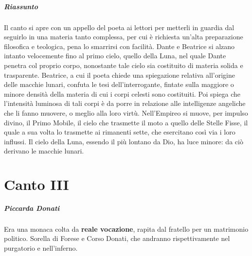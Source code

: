 \documentclass[a4paper, twoside, titlepage]{book}
\newcounter{mar}
\begin{document}
\paragraph{Riassunto} Il canto si apre con un appello del poeta ai lettori per metterli in guardia dal seguirlo in una materia
tanto complessa, per cui è richiesta un’alta preparazione filosofica e teologica, pena lo smarrirsi con
facilità. Dante e Beatrice si alzano intanto velocemente fino al primo cielo, quello della Luna, nel quale
Dante penetra col proprio corpo, nonostante tale cielo sia costituito di materia solida e trasparente.
Beatrice, a cui il poeta chiede una spiegazione relativa all’origine delle macchie lunari, confuta le tesi
dell’interrogante, fintate sulla maggiore o minore densità della materia di cui i corpi celesti sono
costituiti. Poi spiega che l’intensità luminosa di tali corpi è da porre in relazione alle intelligenze
angeliche che li fanno muovere, o meglio alla loro virtù. Nell’Empireo si muove, per impulso divino, il
Primo Mobile, il cielo che trasmette il moto a quello delle Stelle Fisse, il quale a sua volta lo
trasmette ai rimanenti sette, che esercitano così via i loro influssi. Il cielo della Luna, essendo il più
lontano da Dio, ha luce minore: da ciò derivano le macchie lunari.

\chapter{Canto III}

\paragraph{Piccarda Donati} Era una monaca colta da \textbf{reale vocazione}, rapita dal fratello per un matrimonio politico. Sorella di Forese e Corso Donati, che andranno rispettivamente nel purgatorio e nell'inferno.
\end{document}
